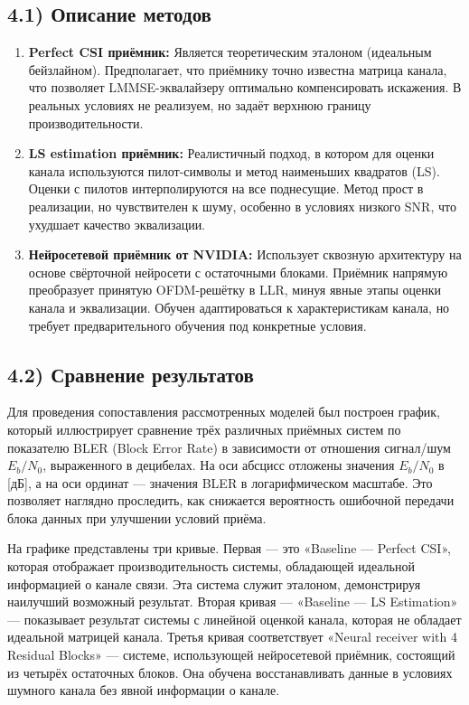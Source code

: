 \documentclass{article}
\begin{document}
\subsection*{4.1) Описание методов}
\begin{enumerate}
    \item \textbf{Perfect CSI приёмник:} Является теоретическим эталоном (идеальным бейзлайном). Предполагает, что приёмнику точно известна матрица канала, что позволяет LMMSE-эквалайзеру оптимально компенсировать искажения. В реальных условиях не реализуем, но задаёт верхнюю границу производительности.
    \item \textbf{LS estimation приёмник:} Реалистичный подход, в котором для оценки канала используются пилот-символы и метод наименьших квадратов (LS). Оценки с пилотов интерполируются на все поднесущие. Метод прост в реализации, но чувствителен к шуму, особенно в условиях низкого SNR, что ухудшает качество эквализации.
    \item \textbf{Нейросетевой приёмник от NVIDIA:} Использует сквозную архитектуру на основе свёрточной нейросети с остаточными блоками. Приёмник напрямую преобразует принятую OFDM-решётку в LLR, минуя явные этапы оценки канала и эквализации. Обучен адаптироваться к характеристикам канала, но требует предварительного обучения под конкретные условия.
\end{enumerate}

\subsection*{4.2) Сравнение результатов}
Для проведения сопоставления рассмотренных моделей был построен график, который иллюстрирует сравнение трёх различных приёмных систем по показателю BLER (Block Error Rate) в зависимости от отношения сигнал/шум $E_b/N_0$, выраженного в децибелах. На оси абсцисс отложены значения $E_b/N_0$ в [дБ], а на оси ординат — значения BLER в логарифмическом масштабе. Это позволяет наглядно проследить, как снижается вероятность ошибочной передачи блока данных при улучшении условий приёма.

На графике представлены три кривые. Первая — это «Baseline — Perfect CSI», которая отображает производительность системы, обладающей идеальной информацией о канале связи. Эта система служит эталоном, демонстрируя наилучший возможный результат. Вторая кривая — «Baseline — LS Estimation» — показывает результат системы с линейной оценкой канала, которая не обладает идеальной матрицей канала. Третья кривая соответствует «Neural receiver with 4 Residual Blocks» — системе, использующей нейросетевой приёмник, состоящий из четырёх остаточных блоков. Она обучена восстанавливать данные в условиях шумного канала без явной информации о канале.
\end{document}
